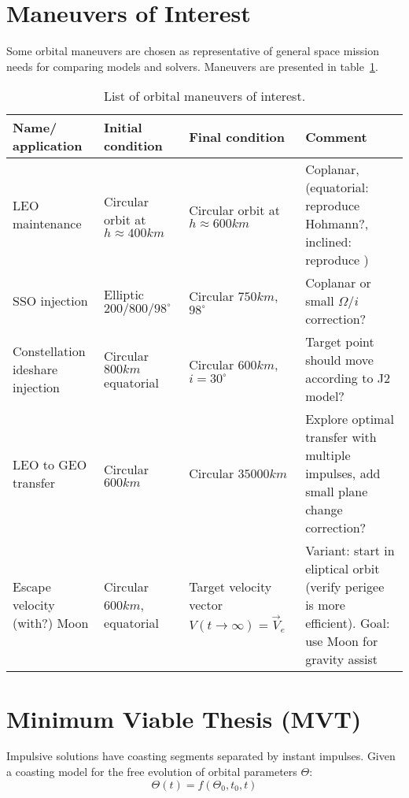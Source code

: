 \section{Maneuvers of Interest}

Some orbital maneuvers are chosen as representative of general space mission needs for comparing models and solvers. Maneuvers are presented in table~\ref{tab:man_interest}. 

\begin{table}[htpb]
    \centering
    \begin{tabular}{>{\centering\arraybackslash}m{3cm}>{\centering\arraybackslash}m{3cm}>{\centering\arraybackslash}m{3cm}>{\centering\arraybackslash}m{3cm}}\toprule
        \textbf{Name/ application} & \textbf{Initial condition} & \textbf{Final condition} & \textbf{Comment}\\ \midrule
        LEO maintenance & Circular orbit at \(h \approx 400km\) & Circular orbit at \(h \approx 600km\) & Coplanar, (equatorial: reproduce Hohmann?, inclined: reproduce \cite{sandro_quasi_circ}) \\ \midrule
        SSO injection & Elliptic \(200/800/98^\circ\) & Circular \(750km\), \(98^\circ \) & Coplanar or small \(\Omega\)/\(i\) correction? \\ \midrule
        Constellation ideshare injection & Circular \(800km\) equatorial & Circular \(600km\), \(i=30^\circ\) & Target point should move according to J2 model? \\ \midrule
        LEO to GEO transfer & Circular \(600km\) & Circular \(35000km\) & Explore optimal transfer with multiple impulses, add small plane change correction? \\ \midrule
        Escape velocity (with?) Moon & Circular \(600km\), equatorial & Target velocity vector \(V(t \rightarrow \infty) = \vec{V}_e\) & Variant: start in eliptical orbit (verify perigee is more efficient). Goal: use Moon for gravity assist \\ \bottomrule
    \end{tabular}
    \caption{List of orbital maneuvers of interest.}\label{tab:man_interest}
\end{table}

\section{Minimum Viable Thesis (MVT)}

Impulsive solutions have coasting segments separated by instant impulses. Given a coasting model for the free evolution of orbital parameters \(\Theta\):
\begin{equation} \label{eq:coasting}
    \Theta(t) = f(\Theta_0, t_0, t)
\end{equation}

